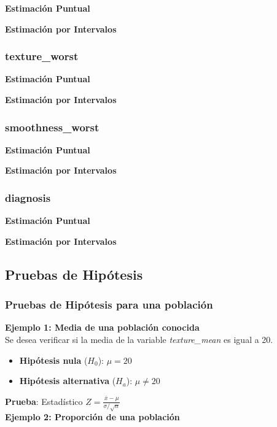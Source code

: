 \documentclass[a4paper, 12pt]{article}
\begin{document}
\textbf{Estimación Puntual}

\textbf{Estimación por Intervalos}


\subsubsection{texture\_worst}

\textbf{Estimación Puntual}

\textbf{Estimación por Intervalos}


\subsubsection{smoothness\_worst}

\textbf{Estimación Puntual}

\textbf{Estimación por Intervalos}


\subsubsection{diagnosis}

\textbf{Estimación Puntual}

\textbf{Estimación por Intervalos}


\subsection{Pruebas de Hipótesis}

\subsubsection{Pruebas de Hipótesis para una población}

\textbf{Ejemplo 1: Media de una población conocida}\\

Se desea verificar si la media de la variable \textit{texture\_mean} es igual a 20. 

\begin{itemize}
	\item \textbf{Hipótesis nula} (\(H_0\)): \(\mu = 20\)
	\item \textbf{Hipótesis alternativa} (\(H_a\)): \(\mu \neq 20\)
\end{itemize}

\textbf{Prueba}: Estadístico \( Z = \frac{\bar{x} - \mu}{\sigma / \sqrt{n}} \)\\

\textbf{Ejemplo 2: Proporción de una población}\\
\end{document}
